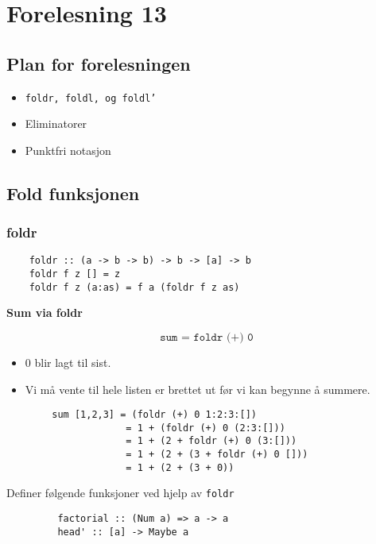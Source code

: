 \documentclass{article}
\begin{document}
    \section{Forelesning 13}

    \subsection{Plan for forelesningen}
    \begin{itemize}
        \item \texttt{foldr, foldl, og foldl'}
        \item Eliminatorer
        \item Punktfri notasjon
    \end{itemize}

    \subsection{Fold funksjonen}
    \subsubsection{foldr}

    \begin{lstlisting}
    foldr :: (a -> b -> b) -> b -> [a] -> b
    foldr f z [] = z
    foldr f z (a:as) = f a (foldr f z as)
    \end{lstlisting}

    \begin{eg}
        \textbf{Sum via foldr}

        \[ \texttt{sum = foldr (+) 0} \]

        \begin{itemize}
            \item 0 blir lagt til sist.
            \item Vi må vente til hele listen er brettet ut før vi kan begynne å summere.
        \end{itemize}
        \begin{lstlisting}
        sum [1,2,3] = (foldr (+) 0 1:2:3:[]) 
                     = 1 + (foldr (+) 0 (2:3:[])) 
                     = 1 + (2 + foldr (+) 0 (3:[])) 
                     = 1 + (2 + (3 + foldr (+) 0 []))
                     = 1 + (2 + (3 + 0))
        \end{lstlisting}
    \end{eg}

     \begin{ex}
         Definer følgende funksjoner ved hjelp av \texttt{foldr}
         
         \begin{lstlisting}
         factorial :: (Num a) => a -> a
         head' :: [a] -> Maybe a
         \end{lstlisting}
     \end{ex}
\end{document}
